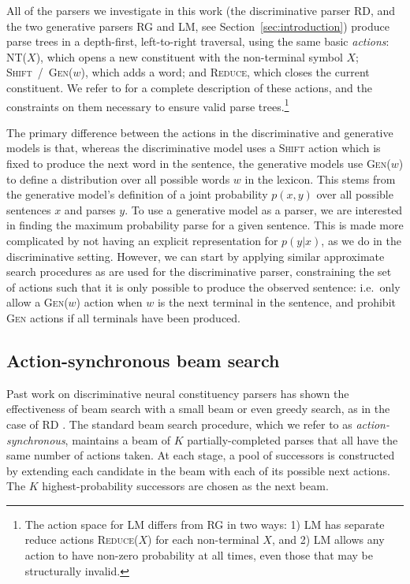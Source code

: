 \documentclass[11pt,a4paper]{article}
\begin{document}
All of the parsers we investigate in this work (the discriminative parser RD, and the two generative parsers RG and LM, see Section~\ref{sec:introduction}) produce parse trees in a depth-first, left-to-right traversal, using the same basic \emph{actions}: 
\textsc{NT($X$)}, which opens a new constituent with the non-terminal symbol $X$;
\mbox{\textsc{Shift / Gen($w$)}}, which adds a word;
and \textsc{Reduce}, which closes the current constituent. 
We refer to \citet{dyer2016recurrent} for a complete description of these actions, and the constraints on them necessary to ensure valid parse trees.\footnote{The action space for LM differs from RG in two ways: 1) LM has separate reduce actions \textsc{Reduce($X$)} for each non-terminal $X$, and 2) LM allows any action to have non-zero probability at all times, even those that may be structurally invalid. 
}

The primary difference between the actions in the discriminative and generative models is that, whereas the discriminative model uses a \textsc{Shift} action which is fixed to produce the next word in the sentence, the generative models use \textsc{Gen($w$)} to define a distribution over all possible words $w$ in the lexicon. This stems from the generative model's definition of a joint probability $p(x, y)$ over all possible sentences $x$ and parses $y$. To use a generative model as a parser, we are interested in finding the maximum probability parse for a given sentence. This is made more complicated by not having an explicit representation for $p(y | x)$, as we do in the discriminative setting. However, we can start by applying similar approximate search procedures as are used for the discriminative parser, constraining the set of actions such that it is only possible to produce the observed sentence: i.e.\ only allow a \textsc{Gen($w$)} action when $w$ is the next terminal in the sentence, and prohibit \textsc{Gen} actions if all terminals have been produced.

\subsection{Action-synchronous beam search}
\label{sec:action-level-beam}
Past work on discriminative neural constituency parsers has shown the effectiveness of beam search with a small beam \cite{vinyals2015grammar} or even greedy search, as in the case of RD \cite{dyer2016recurrent}. The standard beam search procedure, which we refer to as \emph{action-synchronous}, maintains a beam of $K$ partially-completed parses that all have the same number of actions taken. At each stage, a pool of successors is constructed by extending each candidate in the beam with each of its possible next actions. The $K$ highest-probability successors are chosen as the next beam.
\end{document}
